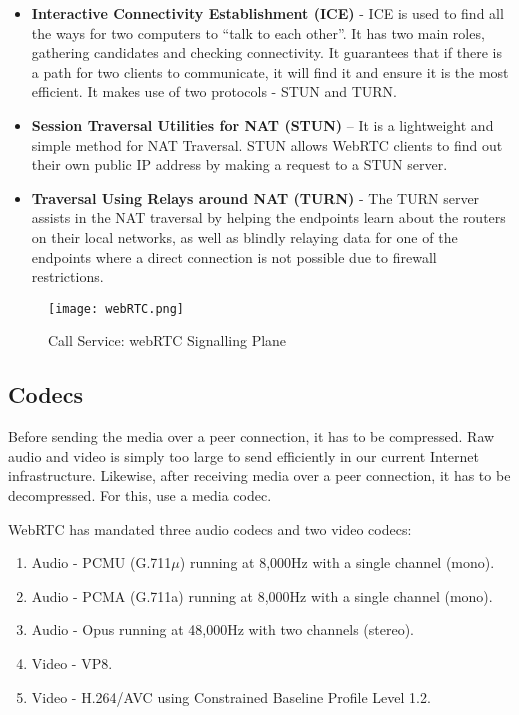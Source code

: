 \begin{itemize}
    \item \textbf{Interactive Connectivity Establishment (ICE)} - ICE is used to find all the ways 
    for two computers to “talk to each other”. It has two main roles, gathering candidates 
    and checking connectivity. It guarantees that if there is a path for two clients to communicate, 
    it will find it and ensure it is the most efficient. It makes use of two protocols - STUN and TURN.
    \item  \textbf{Session Traversal Utilities for NAT (STUN)}  – It is a lightweight and simple 
    method for NAT Traversal. STUN allows WebRTC clients to find out their own public IP address 
    by making a request to a STUN server. 
    \item  \textbf{Traversal Using Relays around NAT (TURN) }  - The TURN server assists in the NAT 
    traversal by helping the endpoints learn about the routers on their local networks, 
    as well as blindly relaying data for one of the endpoints where a direct connection is 
    not possible due to firewall restrictions.
\end{itemize}

\begin{figure}
\begin{center}
    \texttt{[image: webRTC.png]}
\end{center}
\caption{Call Service: webRTC Signalling Plane}
\label{fig:webrtc}
\end{figure}

\subsection{Codecs}

Before sending the media over a peer connection, it has to be compressed. 
Raw audio and video is simply too large to send efficiently in our current Internet infrastructure.
Likewise, after receiving media over a peer connection, it has to be decompressed. 
For this, use a media codec.

WebRTC has mandated three audio codecs and two video codecs:

\begin{enumerate}
    \item Audio - PCMU (G.711$\mu$) running at 8,000Hz with a single channel (mono).
    \item Audio - PCMA (G.711a) running at 8,000Hz with a single channel (mono).
    \item Audio - Opus running at 48,000Hz with two channels (stereo).
    \item Video - VP8.
    \item Video - H.264/AVC using Constrained Baseline Profile Level 1.2.
\end{enumerate} 

